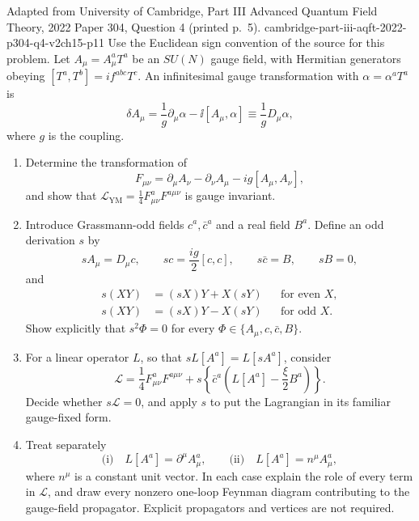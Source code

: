 \begin{enumerate}
  {Adapted from University of Cambridge, Part III Advanced Quantum Field
  Theory, 2022 Paper 304, Question 4 (printed p.~5).}
  {cambridge-part-iii-aqft-2022-p304-q4-v2ch15-p11}
  Use the Euclidean sign convention of the source for this problem.  Let
  \(A_\mu=A_\mu^aT^a\) be an \(SU(N)\) gauge field, with Hermitian
  generators obeying
  \([T^a,T^b]=if^{abc}T^c\).  An infinitesimal gauge transformation with
  \(\alpha=\alpha^aT^a\) is
  \[
    \delta A_\mu=\frac1g\partial_\mu\alpha-\ii[A_\mu,\alpha]
      \equiv\frac1gD_\mu\alpha,
  \]
  where \(g\) is the coupling.
  \begin{enumerate}
    \item[(a)] Determine the transformation of
      \[
        F_{\mu\nu}=\partial_\mu A_\nu-\partial_\nu A_\mu
          -ig[A_\mu,A_\nu],
      \]
      and show that
      \(\mathcal L_{\mathrm{YM}}=\tfrac14F^a_{\mu\nu}F^{a\mu\nu}\)
      is gauge invariant.
    \item[(b)] Introduce Grassmann-odd fields \(c^a,\bar c^a\) and a real
      field \(B^a\).  Define an odd derivation \(s\) by
      \[
        sA_\mu=D_\mu c,
        \qquad sc=\frac{ig}{2}[c,c],
        \qquad s\bar c=B,
        \qquad sB=0,
      \]
      and
      \[
        \begin{aligned}
          s(XY)&=(sX)Y+X(sY) &&\text{for even \(X\)},\\
          s(XY)&=(sX)Y-X(sY) &&\text{for odd \(X\)}.
        \end{aligned}
      \]
      Show explicitly that \(s^2\Phi=0\) for every
      \(\Phi\in\{A_\mu,c,\bar c,B\}\).
    \item[(c)] For a linear operator \(L\), so that
      \(sL[A^a]=L[sA^a]\), consider
      \[
        \mathcal L=\frac14F^a_{\mu\nu}F^{a\mu\nu}
          +s\!\left\{\bar c^a
            \left(L[A^a]-\frac\xi2B^a\right)\right\}.
      \]
      Decide whether \(s\mathcal L=0\), and apply \(s\) to put the
      Lagrangian in its familiar gauge-fixed form.
    \item[(d)] Treat separately
      \[
        \text{(i)}\quad L[A^a]=\partial^\mu A_\mu^a,
        \qquad
        \text{(ii)}\quad L[A^a]=n^\mu A_\mu^a,
      \]
      where \(n^\mu\) is a constant unit vector.  In each case explain the
      role of every term in \(\mathcal L\), and draw every nonzero one-loop
      Feynman diagram contributing to the gauge-field propagator.  Explicit
      propagators and vertices are not required.
  \end{enumerate}


\end{enumerate}

